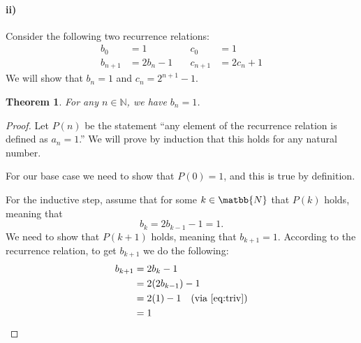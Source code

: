 \documentclass[10pt,letter]{article}
\newtheorem*{thm}{Theorem}
\begin{document}
\paragraph{ii)} Consider the following two recurrence relations:
\begin{align*}
  b_0 &= 1 &\quad c_0 &= 1\\
  b_{n+1} &= 2b_n - 1 &\quad c_{n+1} &= 2c_n + 1
\end{align*}
We will show that $b_n = 1$ and $c_n = 2^{n+1} - 1$.

\begin{thm}
  For any $n \in \mathbb{N}$, we have $b_n = 1$.
\end{thm}
\begin{proof}
  Let $P(n)$ be the statement ``any element of the recurrence relation is defined as $a_n = 1$.'' We will prove by induction that this holds for any natural number.
  
  For our base case we need to show that $P(0) = 1$, and this is true by definition.

  For the inductive step, assume that for some $k \in \matbb{N}$ that $P(k)$ holds, meaning that
  \begin{equation} \label{eq:triv}
    b_{k} = 2b_{k-1} - 1 = 1.
  \end{equation}
  We need to show that $P(k+1)$ holds, meaning that $b_{k+1} = 1$. According to the recurrence relation, to get $b_{k+1}$ we do the following:
  \begin{align*}
    b_{k+1} &= 2b_k - 1\\
    &= 2(2b_{k-1}) - 1 \\
    &= 2(1) - 1\quad (\text{via } \ref{eq:triv})\\
    &= 1
  \end{align*}
\end{proof}
\end{document}
